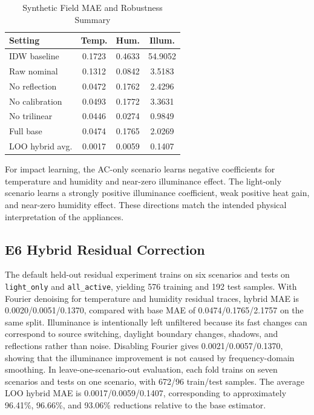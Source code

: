 \documentclass[conference]{IEEEtran}
\begin{document}
\begin{table}[t]
\caption{Synthetic Field MAE and Robustness Summary}
\label{tab:synthetic}
\centering
\scriptsize
\begin{tabular}{|l|c|c|c|}
\hline
Setting & Temp. & Hum. & Illum.\\
\hline
IDW baseline & 0.1723 & 0.4633 & 54.9052\\
Raw nominal & 0.1312 & 0.0842 & 3.5183\\
No reflection & 0.0472 & 0.1762 & 2.4296\\
No calibration & 0.0493 & 0.1772 & 3.3631\\
No trilinear & 0.0446 & 0.0274 & 0.9849\\
Full base & 0.0474 & 0.1765 & 2.0269\\
LOO hybrid avg. & 0.0017 & 0.0059 & 0.1407\\
\hline
\end{tabular}
\end{table}

For impact learning, the AC-only scenario learns negative coefficients for temperature and humidity and near-zero illuminance effect. The light-only scenario learns a strongly positive illuminance coefficient, weak positive heat gain, and near-zero humidity effect. These directions match the intended physical interpretation of the appliances.

\subsection{E6 Hybrid Residual Correction}
The default held-out residual experiment trains on six scenarios and tests on \texttt{light\_only} and \texttt{all\_active}, yielding 576 training and 192 test samples. With Fourier denoising for temperature and humidity residual traces, hybrid MAE is 0.0020/0.0051/0.1370, compared with base MAE of 0.0474/0.1765/2.1757 on the same split. Illuminance is intentionally left unfiltered because its fast changes can correspond to source switching, daylight boundary changes, shadows, and reflections rather than noise. Disabling Fourier gives 0.0021/0.0057/0.1370, showing that the illuminance improvement is not caused by frequency-domain smoothing. In leave-one-scenario-out evaluation, each fold trains on seven scenarios and tests on one scenario, with 672/96 train/test samples. The average LOO hybrid MAE is 0.0017/0.0059/0.1407, corresponding to approximately 96.41\%, 96.66\%, and 93.06\% reductions relative to the base estimator.
\end{document}
